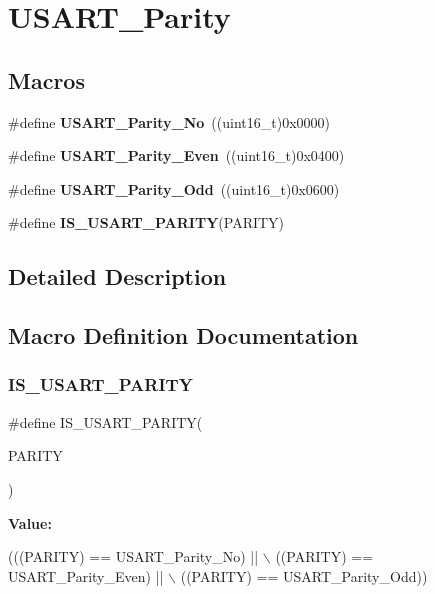 \section{U\+S\+A\+R\+T\+\_\+\+Parity}
\label{group__USART__Parity}
\subsection*{Macros}
\begin{DoxyCompactItemize}
\item 
\#define \textbf{ U\+S\+A\+R\+T\+\_\+\+Parity\+\_\+\+No}~((uint16\+\_\+t)0x0000)
\item 
\#define \textbf{ U\+S\+A\+R\+T\+\_\+\+Parity\+\_\+\+Even}~((uint16\+\_\+t)0x0400)
\item 
\#define \textbf{ U\+S\+A\+R\+T\+\_\+\+Parity\+\_\+\+Odd}~((uint16\+\_\+t)0x0600)
\item 
\#define \textbf{ I\+S\+\_\+\+U\+S\+A\+R\+T\+\_\+\+P\+A\+R\+I\+TY}(P\+A\+R\+I\+TY)
\end{DoxyCompactItemize}


\subsection{Detailed Description}


\subsection{Macro Definition Documentation}
\mbox{\label{group__USART__Parity_gaa87b2e338e0ccc42887d3c56901bee87}} 
\subsubsection{I\+S\+\_\+\+U\+S\+A\+R\+T\+\_\+\+P\+A\+R\+I\+TY}
{\footnotesize\ttfamily \#define I\+S\+\_\+\+U\+S\+A\+R\+T\+\_\+\+P\+A\+R\+I\+TY(\begin{DoxyParamCaption}\item[{}]{P\+A\+R\+I\+TY }\end{DoxyParamCaption})}

{\bfseries Value\+:}
\begin{DoxyCode}
(((PARITY) == USART_Parity_No) || \(\backslash\)
                                 ((PARITY) == USART_Parity_Even) || \(\backslash\)
                                 ((PARITY) == USART_Parity_Odd))
\end{DoxyCode}


